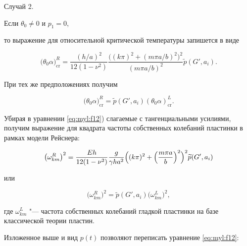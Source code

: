 {\small \sc  Случай 2.}

Если $\theta_0\neq0$ и $p_1=0$,

то выражение для относительной критической температуры запишется в виде

\begin{equation}\label{eq:myl:f20}

\bigl(\theta_0 \alpha\bigr)_{\text{cr}}^R=

\frac{({h}/{a})^2}{12(1-\nu^2)}

\frac{\bigl((k\pi)^2+({m\pi a}/{b})^2\bigr)^2}{({m\pi a}/{b})^2}\widetilde{p}(G',a_i).

\end{equation}

При тех же предположениях получим

\begin{equation}\label{eq:myl:f22}

\bigl(\theta_0 \alpha\bigr)_{\text{cr}}^R=\widetilde{p}(G',a_i) (\theta_0 \alpha )_{\text{cr}}^L.

\end{equation}



\smallskip



Убирая в уравнении \eqref{eq:myl:f12}) слагаемые с тангенциальными усилиями, получим выражение для квадрата частоты собственных колебаний пластинки в рамках модели Рейснера:

\begin{equation}\label{eq:myl:f22}

\bigl(\omega_{km}^R\bigr)^2=

\frac{E h}{12(1-\nu^2)}\frac{g}{\gamma h a^2}

\Bigl((k\pi)^2+\Bigl(\frac{m\pi a}{b}\Bigr)^2\Bigr)^2 

\widetilde{p}(G',a_i)

\end{equation}

или

$$

\bigl(\omega_{km}^R\bigr)^2=\widetilde{p}(G',a_i) \bigl(\omega_{km}^L\bigr)^2,

$$  

где $\omega_{km}^L$ "--- частота собственных колебаний гладкой пластинки на базе классической теории пластин.



Изложенное выше и вид $p(t)$ позволяют переписать уравнение \eqref{eq:myl:f12}:

